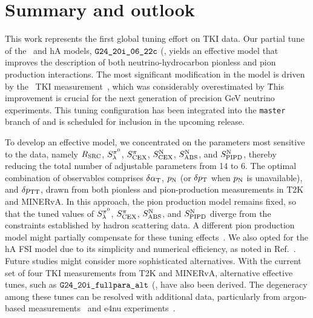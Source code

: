 \section{\label{sec:summary}Summary and outlook}
This work represents the first global tuning effort on TKI data. 
Our partial tune of the \sfcfg\ and hA models, $\texttt{G24\_20i\_06\_22c}$ (\gC\), yields an effective model that improves the description of both neutrino-hydrocarbon pionless and pion production interactions. 
The most significant modification in the model is driven by the \minpiz\ TKI measurement~\cite{MINERvA:2020anu}, which was considerably overestimated by \genie\. 
This improvement is crucial for the next generation of precision GeV neutrino experiments. 
This tuning configuration has been integrated into the \texttt{master} branch of \genie and is scheduled for inclusion in the upcoming release.

To develop an effective model, we concentrated on the parameters most sensitive to the data, namely $R_\textrm{SRC}$, $S_\lambda^{\pi^{0}}$, $S_\textrm{CEX}^{\pi}$, $S_\textrm{CEX}^\textrm{N}$, $S_\textrm{ABS}^\textrm{N}$, and $S_\textrm{PIPD}^\textrm{N}$, thereby reducing the total number of adjustable parameters from 14 to 6. 
The optimal combination of observables comprises $\delta\alpha_\textrm{T}$, $p_\textrm{N}$ (or $\delta p_\textrm{T}$ when $p_\textrm{N}$ is unavailable), and $\delta p_\textrm{TT}$, drawn from both pionless and pion-production measurements in T2K and MINERvA. 
In this approach, the pion production model remains fixed, so that the tuned values of $S_\lambda^{\pi^{0}}$, $S_\textrm{CEX}^{\pi}$, $S_\textrm{ABS}^\textrm{N}$, and $S_\textrm{PIPD}^\textrm{N}$ diverge from the constraints established by hadron scattering data. 
A different pion production model might partially compensate for these tuning effects~\cite{Yan:2024kkg}. 
We also opted for the hA FSI model due to its simplicity and numerical efficiency, as noted in Ref.~\cite{GENIE:2022qrc}.
Future studies might consider more sophisticated alternatives. 
With the current set of four TKI measurements from T2K and MINERvA, alternative effective tunes, such as $\texttt{G24\_20i\_fullpara\_alt}$ (\gT\), have also been derived. 
The degeneracy among these tunes can be resolved with additional data, particularly from argon-based measurements~\cite{MicroBooNE:2022emb, MicroBooNE:2023cmw, MicroBooNE:2023tzj, MicroBooNE:2023wzy, MicroBooNE:2024tmp, MicroBooNE:2015bmn} and e4nu experiments~\cite{CLAS:2021neh}.


